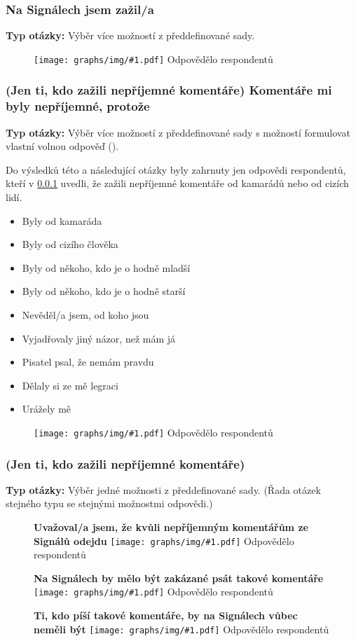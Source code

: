 \documentclass[12pt, a4paper, twoside]{article}
\newcommand{\answercount}[1]{Odpovědělo  respondentů}
\newcommand{\includegraph}[2]{
  \begin{figure}[H]
    \centering
    \textbf{#2}
    \texttt{[image: graphs/img/\#1.pdf]}
    \answercount{#1}
  \end{figure}
}
\newcommand{\qtype}{\textbf{Typ otázky:}
}
\newcommand{\pickOne}{Výběr jedné možnosti z předdefinované sady\xspace}
\newcommand{\pickMultiple}{Výběr více možností z předdefinované sady\xspace}
\newcommand{\withOther}{s možností formulovat vlastní volnou odpověď (\uv{Jiné})\xspace}
\newcommand{\series}{(Řada otázek stejného typu se stejnými možnostmi odpovědi.)\xspace}
\begin{document}
\subsubsection{Na Signálech jsem zažil/a}\label{sec:neprijemneco}

\qtype \pickMultiple.

\includegraph{neprijemne_co}{}

\subsubsection{(Jen ti, kdo zažili nepříjemné komentáře) Komentáře mi byly nepříjemné, protože}

\qtype \pickMultiple \withOther.

Do výsledků této a následující otázky byly zahrnuty
jen odpovědi respondentů,
kteří v \ref{sec:neprijemneco} uvedli, že zažili nepříjemné komentáře
od kamarádů nebo od cizích lidí.

\begin{itemize}
\item Byly od kamaráda
\item Byly od cizího člověka
\item Byly od někoho, kdo je o hodně mladší
\item Byly od někoho, kdo je o hodně starší
\item Nevěděl/a jsem, od koho jsou
\item Vyjadřovaly jiný názor, než mám já
\item Pisatel psal, že nemám pravdu
\item Dělaly si ze mě legraci
\item Urážely mě
\end{itemize}

\includegraph{neprijemne_komentare_protoze}{}

\subsubsection{(Jen ti, kdo zažili nepříjemné komentáře)}

\qtype \pickOne. \series

\includegraph{neprijemne_komentare_zvazoval_odchod}{Uvažoval/a jsem, že kvůli nepříjemným komentářům ze Signálů odejdu}

\includegraph{neprijemne_komentare_zakazat}{Na Signálech by mělo být zakázané psát takové komentáře}

\includegraph{neprijemne_komentare_pisatele_pryc}{Ti, kdo píší takové komentáře, by na Signálech vůbec neměli být}
\end{document}
